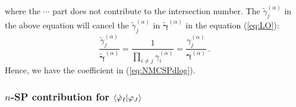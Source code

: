 \documentclass[a4paper,11pt]{article}
\def\eref#1{(\ref{#1})}
\begin{document}
where the $\cdots$ part does not contribute to the intersection number. 
The $\tilde{\gamma}^{(\alpha)}_j$ in the above equation will cancel the $\tilde{\gamma}^{(\alpha)}_j$ in $\bm{\tilde{\gamma}}^{(\alpha)}$ in the equation \eref{eq:LO}:
\begin{equation}
	\frac{{\tilde{\gamma}}^{(\alpha)}_j }{\bm{{\tilde{\gamma}}}^{(\alpha)}}= \frac{1}{\prod_{i\neq j} \gamma^{(\alpha)}_i }  = \frac{\gamma^{(\alpha)}_j }{\bm{{\gamma}}^{(\alpha)}} \, .
\end{equation}
Hence, we have the coefficient in \eref{eq:NMCSPdlog}.



\subsubsection{$n$-SP contribution for $\braket{\dot{\varphi}_I|\varphi_J}$}
\end{document}
